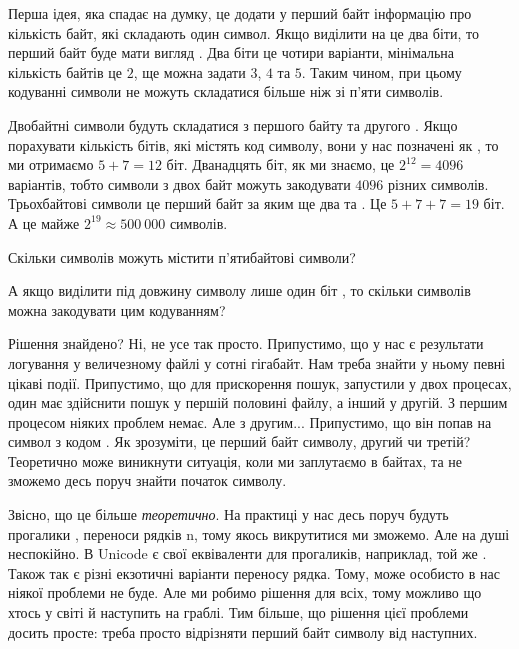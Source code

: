 Перша ідея, яка спадає на думку, це додати у перший байт інформацію про кількість байт, які складають один символ.
Якщо виділити на це два біти, то перший байт буде мати вигляд .
Два біти це чотири варіанти, мінімальна кількість байтів це $2$, ще можна задати $3$, $4$ та $5$.
Таким чином, при цьому кодуванні символи не можуть складатися більше ніж зі п'яти символів.

Двобайтні символи будуть складатися з першого байту  та другого .
Якщо порахувати кількість бітів, які містять код символу, вони у нас позначені як , то ми отримаємо $5+7=12$ біт.
Дванадцять біт, як ми знаємо, це $2^{12}=4096$ варіантів, тобто символи з двох байт можуть закодувати $4096$ різних символів.
Трьохбайтові символи це перший байт  за яким ще два  та .
Це $5+7+7=19$ біт.
А це майже $2^{19} \approx 500~000$ символів.

\begin{exercise}
Скільки символів можуть містити п'ятибайтові символи?
\end{exercise}

\begin{exercise}
А якщо виділити під довжину символу лише один біт , то скільки символів можна закодувати цим кодуванням?
\end{exercise}

Рішення знайдено? Ні, не усе так просто.
Припустимо, що у нас є результати логування у величезному файлі у сотні гігабайт.
Нам треба знайти у ньому певні цікаві події.
Припустимо, що для прискорення пошук, запустили у двох процесах, один має здійснити пошук у першій половині файлу, а інший у другій.
З першим процесом ніяких проблем немає.
Але з другим...
Припустимо, що він попав на символ з кодом .
Як зрозуміти, це перший байт символу, другий чи третій?
Теоретично може виникнути ситуація, коли ми заплутаємо в байтах, та не зможемо десь поруч знайти початок символу.

Звісно, що це більше \textit{теоретично}.
На практиці у нас десь поруч будуть прогалики \chr{\s}, переноси рядків \chesc n, тому якось викрутитися ми зможемо.
Але на душі неспокійно.
В Unicode є свої еквіваленти для прогаликів, наприклад, той же .
Також так є різні екзотичні варіанти переносу рядка.
Тому, може особисто в нас ніякої проблеми не буде.
Але ми робимо рішення для всіх, тому можливо що хтось у світі й наступить на граблі.
Тим більше, що рішення цієї проблеми досить просте: треба просто відрізняти перший байт символу від наступних.

